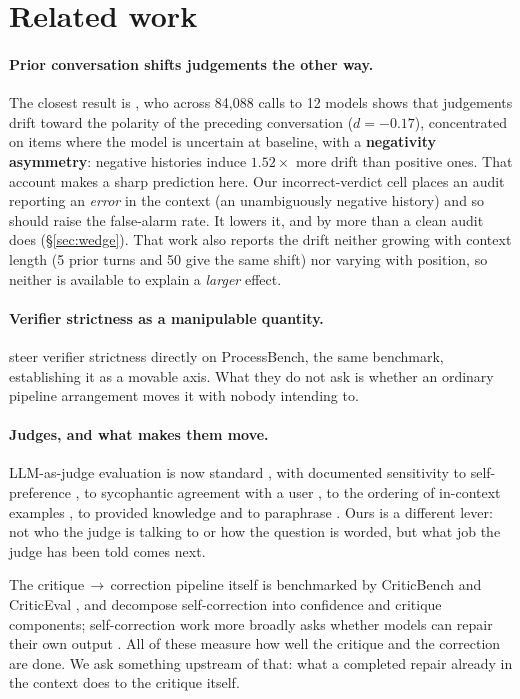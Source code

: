 \documentclass[11pt]{article}
\begin{document}
\section{Related work}
\label{sec:related}

\paragraph{Prior conversation shifts judgements the other way.}
The closest result is \citet{temkit2026}, who across 84{,}088 calls to 12 models shows that judgements
drift toward the polarity of the preceding conversation ($d = -0.17$), concentrated on items where the
model is uncertain at baseline, with a \textbf{negativity asymmetry}: negative histories induce
$1.52\times$ more drift than positive ones. That account makes a sharp prediction here. Our
incorrect-verdict cell places an audit reporting an \emph{error} in the context (an unambiguously
negative history) and so should raise the false-alarm rate. It lowers it, and by more than a clean
audit does (\S\ref{sec:wedge}). That work also reports the drift neither growing with context length (5 prior turns and 50 give
the same shift) nor varying with position, so neither is available to explain a \emph{larger} effect.

\paragraph{Verifier strictness as a manipulable quantity.}
\citet{verifier2026} steer verifier strictness directly on ProcessBench, the same benchmark,
establishing it as a movable axis. What they do not ask is whether an ordinary pipeline arrangement
moves it with nobody intending to.

\paragraph{Judges, and what makes them move.}
LLM-as-judge evaluation is now standard \citep{zheng2023judging,gu2024survey}, with documented
sensitivity to self-preference \citep{panickssery2024llm}, to sycophantic agreement with a user
\citep{sharma2023sycophancy}, to the ordering of in-context examples \citep{lu2022fantastically}, to provided knowledge
\citep{li2025} and to paraphrase \citep{judgesense2026}. Ours is a different lever: not who the judge
is talking to or how the question is worded, but what job the judge has been told comes next.

The critique\,$\to$\,correction pipeline itself is benchmarked by CriticBench \citep{lin2024} and
CriticEval \citep{lan2024}, and \citet{yang2025} decompose self-correction into confidence and critique
components; self-correction work more broadly asks whether models can repair their own output
\citep{huang2024large,olausson2024self}. All of these measure how well the critique and the correction
are done. We ask something upstream of that: what a completed repair already in the context does to the
critique itself.
\end{document}
